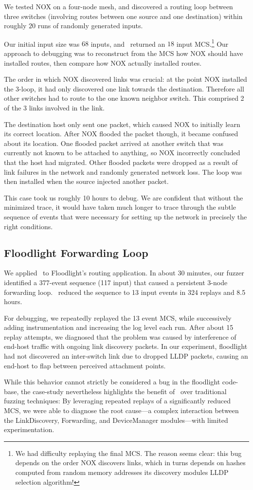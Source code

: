 We tested NOX on a four-node mesh, and discovered a
routing loop between three switches (involving routes between one source and
one destination) within
roughly $20$ runs of randomly generated inputs.

Our initial input size was $68$ inputs, and
\projectname~returned an $18$ input MCS.\footnote{We had difficulty replaying
the final MCS. The reason seems clear: this bug depends on the
order NOX discovers links, which in turns depends on hashes computed from random memory
addresses its discovery modules LLDP selection algorithm!}
Our approach to debugging was to
reconstruct from the MCS how NOX should have installed routes, then compare
how NOX actually installed routes.

The order in which NOX discovered links was crucial: at the point NOX
installed the 3-loop, it had only discovered one link towards the destination.
Therefore all other switches had to route to the one known neighbor switch.
This comprised 2 of the 3 links involved in the link.

The destination host only sent one packet, which caused NOX to initially learn
its correct location. After NOX flooded the packet though, it became confused
about its location. One flooded packet arrived at
another switch that was currently not known to be attached to anything, so NOX
incorrectly concluded that the host had migrated. Other flooded packets were
dropped as a result of link failures in the network and randomly generated
network loss. The loop was then installed when the source injected another
packet.

This case took us roughly 10 hours to debug. We are confident that without the
minimized trace, it would have taken much
longer to trace through the subtle sequence of events that were necessary for
setting up the network in precisely the right conditions.

\subsection{Floodlight Forwarding Loop}

We applied \projectname~to Floodlight's routing application.
In about 30 minutes, our fuzzer identified a 377-event
sequence (117 input) that caused a persistent 3-node forwarding loop.
\projectname~reduced the sequence to 13 input events in 324 replays and 8.5 hours.

For debugging, we repeatedly replayed the 13 event MCS, while successively adding
instrumentation and increasing the log level each run. After about 15 replay
attempts, we diagnosed that the problem was caused by interference of end-host
traffic with ongoing link discovery packets. In our experiment, floodlight had
not discovered an inter-switch link due to dropped LLDP packets, causing an
end-host to flap between perceived attachment points.

While this behavior cannot strictly be considered a bug in the floodlight
code-base, the case-study nevertheless highlights the benefit of
\projectname~over traditional fuzzing techniques: By leveraging repeated replays
of a significantly reduced MCS, we were able to diagnose the root cause---a
complex interaction between the LinkDiscovery, Forwarding, and DeviceManager
modules---with limited experimentation.
